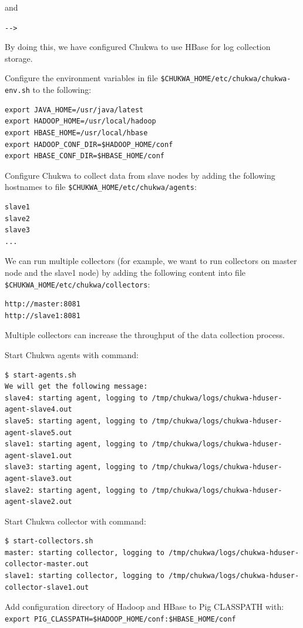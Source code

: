 and

\verb|-->|

By doing this, we have configured Chukwa to use HBase for log collection storage.

Configure the environment variables in file \verb|$CHUKWA_HOME/etc/chukwa/chukwa-env.sh| to the following: 
\begin{verbatim}
export JAVA_HOME=/usr/java/latest
export HADOOP_HOME=/usr/local/hadoop
export HBASE_HOME=/usr/local/hbase
export HADOOP_CONF_DIR=$HADOOP_HOME/conf
export HBASE_CONF_DIR=$HBASE_HOME/conf
\end{verbatim}

Configure Chukwa to collect data from slave nodes by adding the following hostnames to file \verb|$CHUKWA_HOME/etc/chukwa/agents|: 
\begin{verbatim}
slave1
slave2
slave3
...
\end{verbatim}

We can run multiple collectors (for example, we want to run collectors on master node and the slave1 node) by adding the following content into file \verb|$CHUKWA_HOME/etc/chukwa/collectors|: 
\begin{verbatim}
http://master:8081
http://slave1:8081
\end{verbatim}

Multiple collectors can increase the throughput of the data collection process.

Start Chukwa agents with command: 
\begin{verbatim}
$ start-agents.sh
We will get the following message:
slave4: starting agent, logging to /tmp/chukwa/logs/chukwa-hduser-agent-slave4.out
slave5: starting agent, logging to /tmp/chukwa/logs/chukwa-hduser-agent-slave5.out
slave1: starting agent, logging to /tmp/chukwa/logs/chukwa-hduser-agent-slave1.out
slave3: starting agent, logging to /tmp/chukwa/logs/chukwa-hduser-agent-slave3.out
slave2: starting agent, logging to /tmp/chukwa/logs/chukwa-hduser-agent-slave2.out
\end{verbatim}

Start Chukwa collector with command: 
\begin{verbatim}
$ start-collectors.sh
master: starting collector, logging to /tmp/chukwa/logs/chukwa-hduser-collector-master.out
slave1: starting collector, logging to /tmp/chukwa/logs/chukwa-hduser-collector-slave1.out
\end{verbatim}

Add configuration directory of Hadoop and HBase to Pig CLASSPATH with: \\
\verb|export PIG_CLASSPATH=$HADOOP_HOME/conf:$HBASE_HOME/conf|

